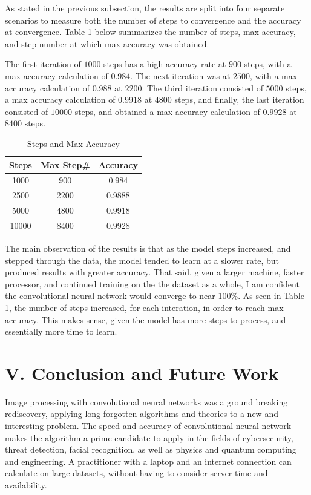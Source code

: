 \documentclass[conference,final,]{IEEEtran}
\begin{document}
As stated in the previous subsection, the results are split into four
separate scenarios to measure both the number of steps to convergence
and the accuracy at convergence. Table \ref{table:accr} below summarizes
the number of steps, max accuracy, and step number at which max accuracy
was obtained.

The first iteration of \(1000\) steps has a high accuracy rate at
\(900\) steps, with a max accuracy calculation of \(0.984\). The next
iteration was at \(2500\), with a max accuracy calculation of \(0.988\)
at \(2200\). The third iteration consisted of \(5000\) steps, a max
accuracy calculation of \(0.9918\) at 4800 steps, and finally, the last
iteration consisted of \(10000\) steps, and obtained a max accuracy
calculation of \(0.9928\) at \(8400\) steps.

\begin{table}[h]
    \caption{Steps and Max Accuracy}
    \centering
        \begin{tabular}{c c c}
            \hline \hline
            Steps & Max Step\# & Accuracy \\ [1ex]
            \hline
            1000  & 900  & 0.984 \\
            2500  & 2200 & 0.9888 \\
            5000  & 4800 & 0.9918 \\
            10000 & 8400 & 0.9928 \\  [1ex]
            \hline
        \end{tabular}
    \label{table:accr}
\end{table}

The main observation of the results is that as the model steps
increased, and stepped through the data, the model tended to learn at a
slower rate, but produced results with greater accuracy. That said,
given a larger machine, faster processor, and continued training on the
the dataset as a whole, I am confident the convolutional neural network
would converge to near 100\%. As seen in Table \ref{table:accr}, the
number of steps increased, for each interation, in order to reach max
accuracy. This makes sense, given the model has more steps to process,
and essentially more time to learn.

\section{V. Conclusion and Future
Work}\label{v.-conclusion-and-future-work}

Image processing with convolutional neural networks was a ground
breaking rediscovery, applying long forgotten algorithms and theories to
a new and interesting problem. The speed and accuracy of convolutional
neural network makes the algorithm a prime candidate to apply in the
fields of cybersecurity, threat detection, facial recognition, as well
as physics and quantum computing and engineering. A practitioner with a
laptop and an internet connection can calculate on large datasets,
without having to consider server time and availability.
\end{document}
